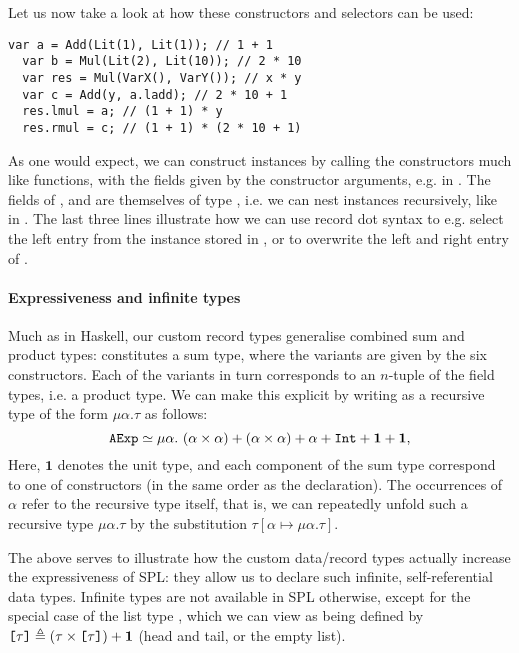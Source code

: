 Let us now take a look at how these constructors and selectors can be used:
\begin{lstlisting}[language=SPL]
  var a = Add(Lit(1), Lit(1)); // 1 + 1
  var b = Mul(Lit(2), Lit(10)); // 2 * 10
  var res = Mul(VarX(), VarY()); // x * y
  var c = Add(y, a.ladd); // 2 * 10 + 1
  res.lmul = a; // (1 + 1) * y
  res.rmul = c; // (1 + 1) * (2 * 10 + 1)
\end{lstlisting}
%
As one would expect, we can construct instances  by calling the
constructors much like functions, with the fields given by the constructor
arguments, e.g.  in . The fields of ,  and
 are themselves of type , i.e. we can nest 
instances recursively, like in .
The last three lines illustrate how we can use record dot syntax to e.g. select
the left entry from the  instance stored in , or to overwrite
the left and right entry of .

\paragraph{Expressiveness and infinite types}
Much as in Haskell, our custom record types generalise combined sum and product
types:  constitutes a sum type, where the variants are given by the
six constructors. Each of the variants in turn corresponds to an $n$-tuple of
the field types, i.e. a product type. We can make this explicit by writing
 as a recursive type of the form $\mu \alpha. \tau$ as follows:
\[ \texttt{AExp} \simeq \mu \alpha.\
    (\alpha \times \alpha) + (\alpha \times \alpha) + \alpha + \texttt{Int} + \mathbf{1} + \mathbf{1} ,\]
%
Here, $\mathbf{1}$ denotes the unit type, and each component of the sum type
correspond to one of constructors (in the same order as the declaration).
The occurrences of $\alpha$ refer to the recursive type itself, that is, we can
repeatedly unfold such a recursive type $\mu\alpha.\tau$ by the substitution
$\tau[\alpha \mapsto \mu\alpha.\tau]$.

The above serves to illustrate how the custom data/record types actually
increase the expressiveness of SPL: they allow us to declare such infinite,
self-referential data types. Infinite types are not available in SPL otherwise,
except for the special case of the list type \spl{[$\tau$]}, which we can view
as being defined by
$\texttt{[$\tau$]} \triangleq (\tau \times \texttt{[$\tau$]}) + \mathbf{1}$
(head and tail, or the empty list).

